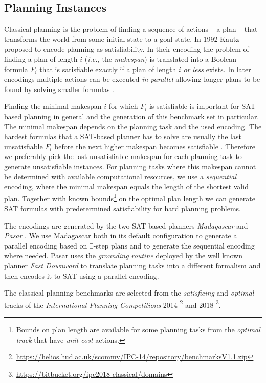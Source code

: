 \documentclass{elsarticle}
\begin{document}
\subsection{Planning Instances}
Classical planning is the problem of finding a sequence of actions -- a plan --
that transforms the world from some initial state to a goal state. In 1992 Kautz
\cite{Kautz1992} proposed to encode planning as satisfiability. In their
encoding the problem of finding a plan of length $i$ (\textit{i.e.,} the
\emph{makespan}) is translated into a Boolean formula $F_i$ that is satisfiable
exactly if a plan of length $i$ \emph{or less} exists. In later encodings
multiple actions can be executed \emph{in parallel} allowing longer plans to be
found by solving smaller formulas \cite{Rintanen2006, Rintanen2007, Balyo2013}.

Finding the minimal makespan $i$ for which $F_i$ is satisfiable is important for
SAT-based planning in general and the generation of this benchmark set in
particular. The minimal makespan depends on the planning task and the used
encoding. The hardest formulas that a SAT-based planner has to solve are usually
the last unsatisfiable $F_i$ before the next higher makespan becomes satisfiable
\cite{Rintanen2006}. Therefore we preferably pick the last unsatisfiable
makespan for each planning task to generate unsatisfiable instances. For
planning tasks where this makespan cannot be determined with available
computational resources, we use a \emph{sequential} encoding, where the minimal
makespan equals the length of the shortest valid plan. Together with known
bounds\footnote{Bounds on plan length are available for some planning tasks from
  the \emph{optimal track} that have \emph{unit cost} actions.} on the optimal
plan length we can generate SAT formulas with predetermined satisfiability for
hard planning problems.

The encodings are generated by the two SAT-based planners \emph{Madagascar}
\cite{Madagascar14} and \emph{Pasar} \cite{Pasar19}. We use Madagascar both in
its default configuration to generate a parallel encoding based on
$\exists$-step plans and to generate the sequential encoding where needed. Pasar
uses the \emph{grounding routine} deployed by the well known planner \emph{Fast
  Downward} \cite{FastDownward06} to translate planning tasks into a different
formalism and then encodes it to SAT using a parallel encoding.

The classical planning benchmarks are selected from the \emph{satisficing} and
\emph{optimal} tracks of the \emph{International Planning Competitions} 2014
\footnote{\url{https://helios.hud.ac.uk/scommv/IPC-14/repository/benchmarksV1.1.zip}}
and 2018 \footnote{\url{https://bitbucket.org/ipc2018-classical/domains}}.
\end{document}
